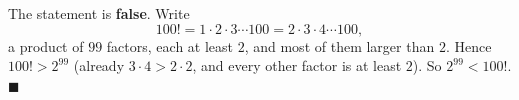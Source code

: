 The statement is \textbf{false}. Write
\[100!=1\cdot2\cdot3\cdots100=2\cdot3\cdot4\cdots100,\]
a product of $99$ factors, each at least $2$, and most of them larger than $2$. Hence $100!>2^{99}$ (already $3\cdot4>2\cdot2$, and every other factor is at least $2$). So $2^{99}<100!$. $\blacksquare$
